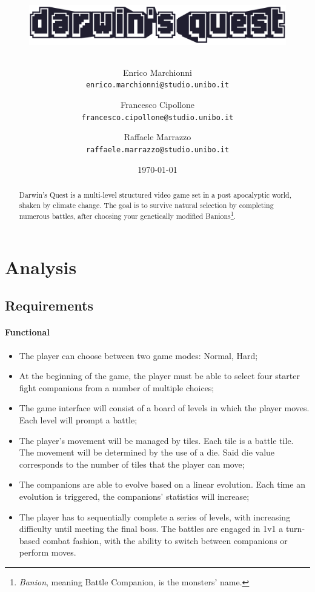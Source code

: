 \documentclass[12pt, a4paper]{report}
\title{
    \begin{figure}[ht]
    \centering{}
    \includegraphics[width=\textwidth]{logo} %
    \end{figure}
}
\author{
    Enrico Marchionni\\
    \texttt{enrico.marchionni@studio.unibo.it}
    \and
    Francesco Cipollone\\
    \texttt{francesco.cipollone@studio.unibo.it}
    \and
    Raffaele Marrazzo\\
    \texttt{raffaele.marrazzo@studio.unibo.it}
}
\date{\today}
\theoremstyle{definition}
\begin{document}
\maketitle

\begin{abstract}

    Darwin's Quest \cite{ontheoriginofspiecies} is a multi-level structured video game set in a post apocalyptic world,
    shaken by climate change. The goal is to survive natural selection by completing numerous battles,
    after choosing your genetically modified Banions\footnote{\emph{Banion}, meaning Battle Companion, is the monsters' name.}.

\end{abstract}

\tableofcontents

\chapter{Analysis}

\section{Requirements}

\subsubsection{Functional}

\begin{itemize}
    \item The player can choose between two game modes: Normal, Hard;
    \item At the beginning of the game, the player must be able to select four starter fight companions from a number of multiple choices;
    \item The game interface will consist of a board of levels in which the player moves. Each level will prompt a battle;
    \item The player's movement will be managed by tiles. Each tile is a battle tile.
        The movement will be determined by the use of a die. Said die value corresponds to the number of tiles that the player can move;
    \item The companions are able to evolve based on a linear evolution. Each time an evolution is triggered, the companions' statistics will increase;
    \item The player has to sequentially complete a series of levels, with increasing difficulty until meeting the final boss.
        The battles are engaged in 1v1 a turn-based combat fashion, with the ability to switch between companions or perform moves.
\end{itemize}
\end{document}
